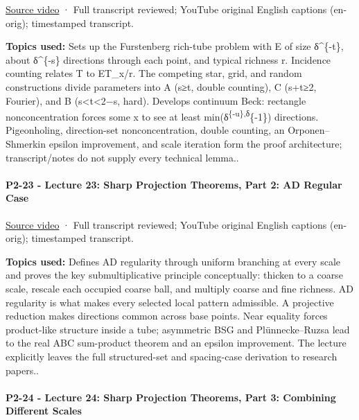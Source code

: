 \href{https://www.youtube.com/watch?v=hBG7nMXTOcw}{Source video} · Full transcript reviewed; YouTube original English captions (en-orig); timestamped transcript.

\textbf{Topics used:} Sets up the Furstenberg rich-tube problem with E of size δ\^{}\{-t\}, about δ\^{}\{-s\} directions through each point, and typical richness r. Incidence counting relates \textbar T\textbar{} to \textbar E\textbar\textbar T\_x\textbar/r. The competing star, grid, and random constructions divide parameters into A (s≥t, double counting), C (s+t≥2, Fourier), and B (s\textless t\textless2−s, hard). Develops continuum Beck: rectangle nonconcentration forces some x to see at least min(δ\textsuperscript{\{-u\},δ}\{-1\}) directions. Pigeonholing, direction-set nonconcentration, double counting, an Orponen--Shmerkin epsilon improvement, and scale iteration form the proof architecture; transcript/notes do not supply every technical lemma..

\paragraph{P2-23 - Lecture 23: Sharp Projection Theorems, Part 2: AD Regular Case}\label{p2-23---lecture-23-sharp-projection-theorems-part-2-ad-regular-case}

\href{https://www.youtube.com/watch?v=I6ZSrgxiofs}{Source video} · Full transcript reviewed; YouTube original English captions (en-orig); timestamped transcript.

\textbf{Topics used:} Defines AD regularity through uniform branching at every scale and proves the key submultiplicative principle conceptually: thicken to a coarse scale, rescale each occupied coarse ball, and multiply coarse and fine richness. AD regularity is what makes every selected local pattern admissible. A projective reduction makes directions common across base points. Near equality forces product-like structure inside a tube; asymmetric BSG and Plünnecke--Ruzsa lead to the real ABC sum-product theorem and an epsilon improvement. The lecture explicitly leaves the full structured-set and spacing-case derivation to research papers..

\paragraph{P2-24 - Lecture 24: Sharp Projection Theorems, Part 3: Combining Different Scales}\label{p2-24---lecture-24-sharp-projection-theorems-part-3-combining-different-scales}

